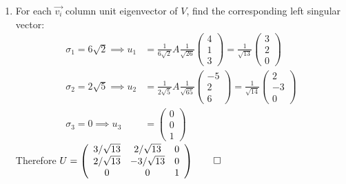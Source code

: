 \documentclass[12pt, a4paper]{article}
\begin{document}
\begin{enumerate}[Q\arabic*.]
\begin{enumerate}[(\alph*)]
      \item For each $\vec{v_i}$ column unit eigenvector of $V$, find the corresponding left singular vector:
        \begin{align*}
          \sigma_1 = 6\sqrt{2} \implies u_1 &= \frac{1}{6\sqrt{2}}A \frac{1}{\sqrt{26}}\left(\begin{array}{c} 4\\ 1\\ 3 \end{array}\right) = \frac{1}{\sqrt{13}}\left(\begin{array}{c} 3\\ 2\\ 0 \end{array}\right)\\
          \sigma_2 = 2\sqrt{5} \implies u_2 &= \frac{1}{2\sqrt{5}}A \frac{1}{\sqrt{65}}\left(\begin{array}{c} -5\\ 2\\ 6 \end{array}\right) = \frac{1}{\sqrt{14}}\left(\begin{array}{c} 2\\ -3\\ 0 \end{array}\right)\\
          \sigma_3 = 0 \implies u_3 &= \left(\begin{array}{c} 0\\ 0\\ 1 \end{array}\right)\tag*{(By choosing orthogonal vector)}
        \end{align*}
        Therefore $U = \left(\begin{array}{ccc} 3/\sqrt{13} & 2/\sqrt{13} & 0\\ 2 /\sqrt{13} & -3 /\sqrt{13}  & 0\\ 0 & 0 & 1 \end{array}\right) \qed$
    \end{enumerate}

  \pagebreak


\end{enumerate}
\end{document}
